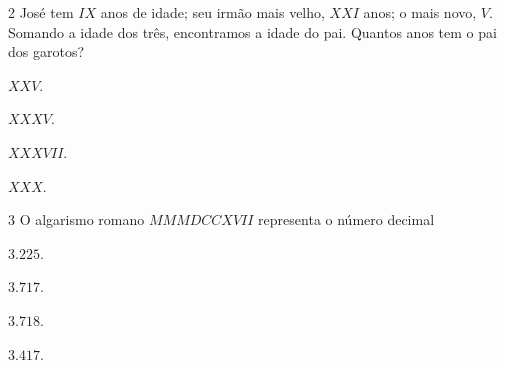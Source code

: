 \num{2} José tem $IX$ anos de idade; seu irmão mais velho, $XXI$ anos; 
o mais novo, $V$. Somando a idade dos três, encontramos a idade do pai.
Quantos anos tem o pai dos garotos?

\begin{escolha}
\item $XXV$.
\item $XXXV$.
\item $XXXVII$.
\item $XXX$.
\end{escolha}





\num{3}  O algarismo romano $MMMDCCXVII$ representa o número decimal

\begin{escolha}
\item $3.225$.
\item $3.717$.
\item $3.718$.
\item $3.417$.
\end{escolha}



